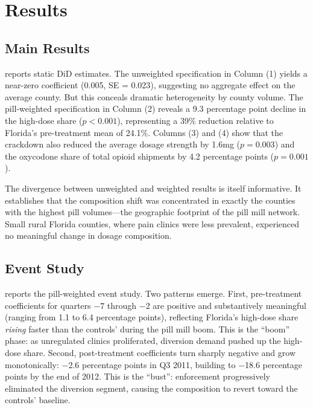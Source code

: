 \documentclass[12pt]{article}
\begin{document}
\section{Results}

\subsection{Main Results}



 reports static DiD estimates. The unweighted specification in Column (1) yields a near-zero coefficient (0.005, SE = 0.023), suggesting no aggregate effect on the average county. But this conceals dramatic heterogeneity by county volume. The pill-weighted specification in Column (2) reveals a 9.3 percentage point decline in the high-dose share ($p < 0.001$), representing a 39\% reduction relative to Florida's pre-treatment mean of 24.1\%. Columns (3) and (4) show that the crackdown also reduced the average dosage strength by 1.6mg ($p = 0.003$) and the oxycodone share of total opioid shipments by 4.2 percentage points ($p = 0.001$).

The divergence between unweighted and weighted results is itself informative. It establishes that the composition shift was concentrated in exactly the counties with the highest pill volumes---the geographic footprint of the pill mill network. Small rural Florida counties, where pain clinics were less prevalent, experienced no meaningful change in dosage composition.

\subsection{Event Study}



 reports the pill-weighted event study. Two patterns emerge. First, pre-treatment coefficients for quarters $-7$ through $-2$ are positive and substantively meaningful (ranging from 1.1 to 6.4 percentage points), reflecting Florida's high-dose share \textit{rising} faster than the controls' during the pill mill boom. This is the ``boom'' phase: as unregulated clinics proliferated, diversion demand pushed up the high-dose share. Second, post-treatment coefficients turn sharply negative and grow monotonically: $-$2.6 percentage points in Q3 2011, building to $-$18.6 percentage points by the end of 2012. This is the ``bust'': enforcement progressively eliminated the diversion segment, causing the composition to revert toward the controls' baseline.
\end{document}
